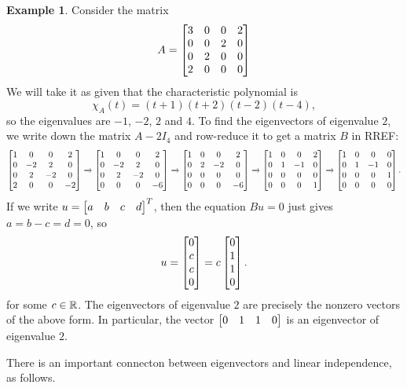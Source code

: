 \documentclass[reqno]{amsart}
\theoremstyle{definition}
\newtheorem{example}[theorem]{Example}
\begin{document}
\begin{example}\label{eg-eigen-v}
 Consider the matrix
 \[ A = \left[\begin{matrix}
         3 & 0 & 0 & 2 \\
         0 & 0 & 2 & 0 \\
         0 & 2 & 0 & 0 \\
         2 & 0 & 0 & 0
        \end{matrix}\right]
 \]
 We will take it as given that the characteristic polynomial is
 \[ \chi_A(t) = (t+1)(t+2)(t-2)(t-4), \]
 so the eigenvalues are $-1$, $-2$, $2$ and $4$.  To find the
 eigenvectors of eigenvalue $2$, we write down the matrix $A-2I_4$ and
 row-reduce it to get a matrix $B$ in RREF:
 \[\left[\begin{matrix}
    1 &  0 &  0 &  2 \\
    0 & -2 &  2 &  0 \\
    0 &  2 & -2 &  0 \\
    2 &  0 &  0 & -2
   \end{matrix}\right]
   \xrightarrow{}
   \left[\begin{matrix}
    1 &  0 &  0 &  2 \\
    0 & -2 &  2 &  0 \\
    0 &  2 & -2 &  0 \\
    0 &  0 &  0 & -6
   \end{matrix}\right]
   \xrightarrow{}
   \left[\begin{matrix}
    1 &  0 &  0 &  2 \\
    0 &  2 & -2 &  0 \\
    0 &  0 &  0 &  0 \\
    0 &  0 &  0 & -6
   \end{matrix}\right]
   \xrightarrow{}
   \left[\begin{matrix}
    1 &  0 &  0 &  2 \\
    0 &  1 & -1 &  0 \\
    0 &  0 &  0 &  0 \\
    0 &  0 &  0 &  1
   \end{matrix}\right]
   \xrightarrow{}
   \left[\begin{matrix}
    1 &  0 &  0 &  0 \\
    0 &  1 & -1 &  0 \\
    0 &  0 &  0 &  1 \\
    0 &  0 &  0 &  0
   \end{matrix}\right].
 \]
 If we write $u=\left[\begin{matrix} a & b & c & d\end{matrix}\right]^T$, then the equation $Bu=0$
 just gives $a=b-c=d=0$, so
 \[ u = \left[\begin{matrix} 0 \\ c \\ c \\ 0 \end{matrix}\right] = c \left[\begin{matrix} 0 \\ 1 \\ 1 \\ 0 \end{matrix}\right]. \]
 for some $c\in{\mathbb{R}}$.  The eigenvectors of eigenvalue $2$ are
 precisely the nonzero vectors of the above form.  In particular, the
 vector $\left[\begin{matrix} 0 & 1 & 1 & 0\end{matrix}\right]$ is an eigenvector of eigenvalue $2$.
\end{example}

There is an important connecton between eigenvectors and linear
independence, as follows.
\end{document}
